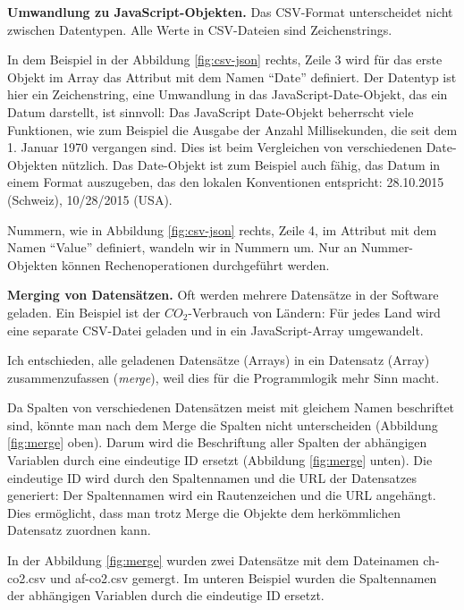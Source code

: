 \textbf{Umwandlung zu JavaScript-Objekten.} Das CSV-Format unterscheidet nicht zwischen Datentypen. Alle Werte in CSV-Dateien sind Zeichenstrings.

In dem Beispiel in der Abbildung \ref{fig:csv-json} rechts, Zeile 3 wird für das erste Objekt im Array das Attribut mit dem Namen "`Date"' definiert. Der Datentyp ist hier ein Zeichenstring, eine Umwandlung in das JavaScript-Date-Objekt, das ein Datum darstellt, ist sinnvoll: Das JavaScript Date-Objekt beherrscht viele Funktionen, wie zum Beispiel die Ausgabe der Anzahl Millisekunden, die seit dem 1. Januar 1970 vergangen sind. Dies ist beim Vergleichen von verschiedenen Date-Objekten nützlich. Das Date-Objekt ist zum Beispiel auch fähig, das Datum in einem Format auszugeben, das den lokalen Konventionen entspricht: 28.10.2015 (Schweiz), 10/28/2015 (USA).

Nummern, wie in Abbildung \ref{fig:csv-json} rechts, Zeile 4, im Attribut mit dem Namen "`Value"' definiert, wandeln wir in Nummern um. Nur an Nummer-Objekten können Rechenoperationen durchgeführt werden.

\textbf{Merging von Datensätzen.} Oft werden mehrere Datensätze in der Software geladen. Ein Beispiel ist der $CO_2$-Verbrauch von Ländern: Für jedes Land wird eine separate CSV-Datei geladen und in ein JavaScript-Array umgewandelt.

Ich entschieden, alle geladenen Datensätze (Arrays) in ein Datensatz (Array) zusammenzufassen (\textit{merge}), weil dies für die Programmlogik mehr Sinn macht.

Da Spalten von verschiedenen Datensätzen meist mit gleichem Namen beschriftet sind, könnte man nach dem Merge die Spalten nicht unterscheiden (Abbildung \ref{fig:merge} oben). Darum wird die Beschriftung aller Spalten der abhängigen Variablen durch eine eindeutige ID ersetzt (Abbildung \ref{fig:merge} unten). Die eindeutige ID wird durch den Spaltennamen und die URL der Datensatzes generiert: Der Spaltennamen wird ein Rautenzeichen und die URL angehängt. Dies ermöglicht, dass man trotz Merge die Objekte dem herkömmlichen Datensatz zuordnen kann.

In der Abbildung \ref{fig:merge} wurden zwei Datensätze mit dem Dateinamen ch-co2.csv und af-co2.csv gemergt. Im unteren Beispiel wurden die Spaltennamen der abhängigen Variablen durch die eindeutige ID ersetzt.

